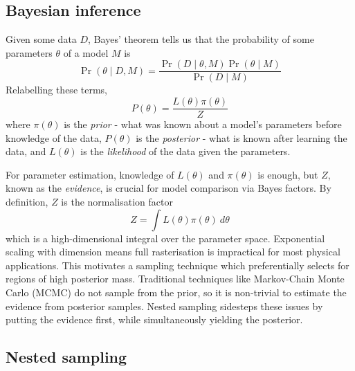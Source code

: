 \documentclass[usenatbib]{mnras}
\begin{document}
\subsection{Bayesian inference}%
\label{sub:Bayesian inference}

Given some data $D$, Bayes' theorem tells us that the probability of some parameters $\theta$ of a model $M$ is 
\begin{equation}
	\Pr(\theta\mid D, M) = \frac{\Pr(D \mid \theta, M) \Pr(\theta \mid M)}{\Pr(D  \mid  M)}
\end{equation}
Relabelling these terms,
\begin{equation}
    P(\theta) = \frac{L(\theta) \pi(\theta)}{Z}
\end{equation}
where $\pi(\theta)$ is the \textit{prior} - what was known about a model's parameters before knowledge of the data, $P(\theta)$ is the \textit{posterior} - what is known after learning the data, and $L(\theta)$ is the \textit{likelihood} of the data given the parameters.
\par
For parameter estimation, knowledge of $L(\theta)$ and $\pi(\theta)$ is enough, but $Z$, known as the \textit{evidence}, is crucial for model comparison via Bayes factors. By definition, $Z$ is the normalisation factor 
\begin{equation}
    Z = \int L(\theta)\pi(\theta) \ d\theta
\end{equation}
which is a high-dimensional integral over the parameter space. Exponential scaling with dimension means full rasterisation is impractical for most physical applications. This motivates a sampling technique which preferentially selects for regions of high posterior mass. Traditional techniques like Markov-Chain Monte Carlo (MCMC) do not sample from the prior, so it is non-trivial to estimate the evidence from posterior samples. Nested sampling sidesteps these issues by putting the evidence first, while simultaneously yielding the posterior.



\subsection{Nested sampling}
\label{sub:Nested sampling}
\end{document}
